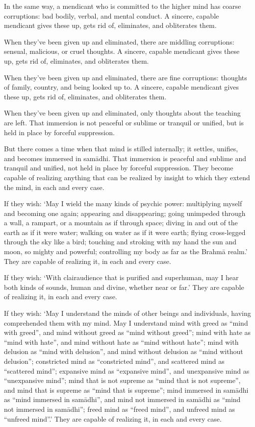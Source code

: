 \documentclass[12pt,openany]{book}%
\begin{document}
In the same way, a mendicant who is committed to the higher mind has coarse corruptions: bad bodily, verbal, and mental conduct. A sincere, capable mendicant gives these up, gets rid of, eliminates, and obliterates them. 

When they’ve been given up and eliminated, there are middling corruptions: sensual, malicious, or cruel thoughts. A sincere, capable mendicant gives these up, gets rid of, eliminates, and obliterates them. 

When they’ve been given up and eliminated, there are fine corruptions: thoughts of family, country, and being looked up to. A sincere, capable mendicant gives these up, gets rid of, eliminates, and obliterates them. 

When they’ve been given up and eliminated, only thoughts about the teaching are left. That immersion is not peaceful or sublime or tranquil or unified, but is held in place by forceful suppression. 

But there comes a time when that mind is stilled internally; it settles, unifies, and becomes immersed in \textsanskrit{samādhi}. That immersion is peaceful and sublime and tranquil and unified, not held in place by forceful suppression. They become capable of realizing anything that can be realized by insight to which they extend the mind, in each and every case. 

If they wish: ‘May I wield the many kinds of psychic power: multiplying myself and becoming one again; appearing and disappearing; going unimpeded through a wall, a rampart, or a mountain as if through space; diving in and out of the earth as if it were water; walking on water as if it were earth; flying cross-legged through the sky like a bird; touching and stroking with my hand the sun and moon, so mighty and powerful; controlling my body as far as the \textsanskrit{Brahmā} realm.’ They are capable of realizing it, in each and every case. 

If they wish: ‘With clairaudience that is purified and superhuman, may I hear both kinds of sounds, human and divine, whether near or far.’ They are capable of realizing it, in each and every case. 

If they wish: ‘May I understand the minds of other beings and individuals, having comprehended them with my mind. May I understand mind with greed as “mind with greed”, and mind without greed as “mind without greed”; mind with hate as “mind with hate”, and mind without hate as “mind without hate”; mind with delusion as “mind with delusion”, and mind without delusion as “mind without delusion”; constricted mind as “constricted mind”, and scattered mind as “scattered mind”; expansive mind as “expansive mind”, and unexpansive mind as “unexpansive mind”; mind that is not supreme as “mind that is not supreme”, and mind that is supreme as “mind that is supreme”; mind immersed in \textsanskrit{samādhi} as “mind immersed in \textsanskrit{samādhi}”, and mind not immersed in \textsanskrit{samādhi} as “mind not immersed in \textsanskrit{samādhi}”; freed mind as “freed mind”, and unfreed mind as “unfreed mind”.’ They are capable of realizing it, in each and every case. 
\end{document}
